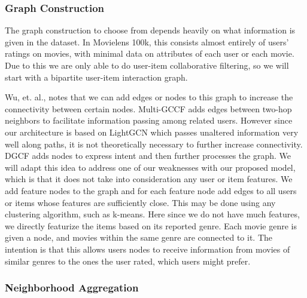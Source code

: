 \documentclass{article}
\begin{document}
\subsubsection{Graph Construction}

The graph construction to choose from depends heavily on what information is given in the dataset. In Movielens 100k, this consists almost entirely of users' ratings on movies, with minimal data on attributes of each user or each movie. Due to this we are only able to do user-item collaborative filtering, so we will start with a bipartite user-item interaction graph.

Wu, et. al., \cite{survey} notes that we can add edges or nodes to this graph to increase the connectivity between certain nodes. Multi-GCCF \cite{multigccf} adds edges between two-hop neighbors to facilitate information passing among related users. However since our architecture is based on LightGCN which passes unaltered information very well along paths, it is not theoretically necessary to further increase connectivity. DGCF \cite{dgcf} adds nodes to express intent and then further processes the graph. We will adapt this idea to address one of our weaknesses with our proposed model, which is that it does not take into consideration any user or item features. We add feature nodes to the graph and for each feature node add edges to all users or items whose features are sufficiently close. This may be done using any clustering algorithm, such as k-means. Here since we do not have much features, we directly featurize the items based on its reported genre. Each movie genre is given a node, and movies within the same genre are connected to it. The intention is that this allows users nodes to receive information from movies of similar genres to the ones the user rated, which users might prefer.

\subsubsection{Neighborhood Aggregation}
\label{neighborhood_aggregation}
\end{document}
